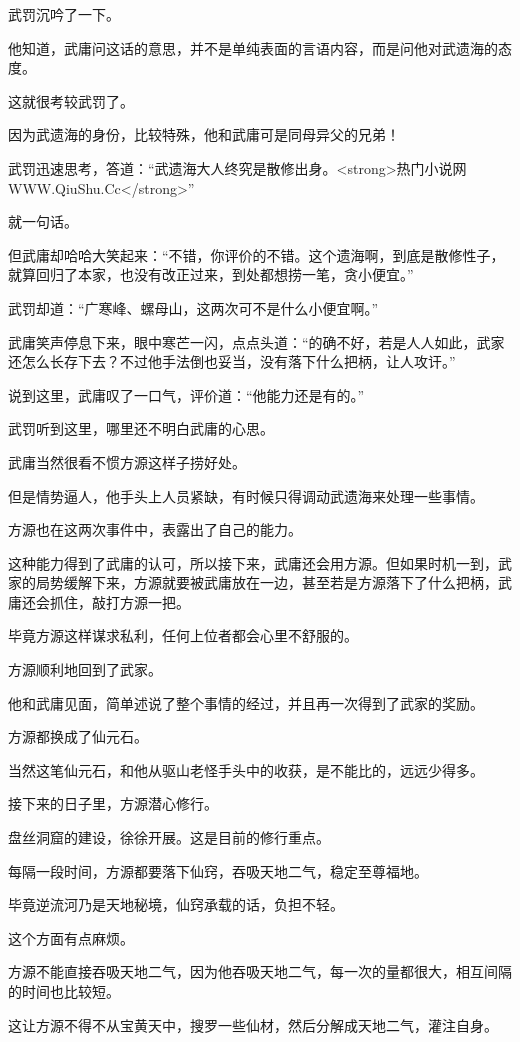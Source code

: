 \begin{this_body}
武罚沉吟了一下。

他知道，武庸问这话的意思，并不是单纯表面的言语内容，而是问他对武遗海的态度。

这就很考较武罚了。

因为武遗海的身份，比较特殊，他和武庸可是同母异父的兄弟！

武罚迅速思考，答道：“武遗海大人终究是散修出身。<strong>热门小说网WWW.QiuShu.Cc</strong>”

就一句话。

但武庸却哈哈大笑起来：“不错，你评价的不错。这个遗海啊，到底是散修性子，就算回归了本家，也没有改正过来，到处都想捞一笔，贪小便宜。”

武罚却道：“广寒峰、螺母山，这两次可不是什么小便宜啊。”

武庸笑声停息下来，眼中寒芒一闪，点点头道：“的确不好，若是人人如此，武家还怎么长存下去？不过他手法倒也妥当，没有落下什么把柄，让人攻讦。”

说到这里，武庸叹了一口气，评价道：“他能力还是有的。”

武罚听到这里，哪里还不明白武庸的心思。

武庸当然很看不惯方源这样子捞好处。

但是情势逼人，他手头上人员紧缺，有时候只得调动武遗海来处理一些事情。

方源也在这两次事件中，表露出了自己的能力。

这种能力得到了武庸的认可，所以接下来，武庸还会用方源。但如果时机一到，武家的局势缓解下来，方源就要被武庸放在一边，甚至若是方源落下了什么把柄，武庸还会抓住，敲打方源一把。

毕竟方源这样谋求私利，任何上位者都会心里不舒服的。

方源顺利地回到了武家。

他和武庸见面，简单述说了整个事情的经过，并且再一次得到了武家的奖励。

方源都换成了仙元石。

当然这笔仙元石，和他从驱山老怪手头中的收获，是不能比的，远远少得多。

接下来的日子里，方源潜心修行。

盘丝洞窟的建设，徐徐开展。这是目前的修行重点。

每隔一段时间，方源都要落下仙窍，吞吸天地二气，稳定至尊福地。

毕竟逆流河乃是天地秘境，仙窍承载的话，负担不轻。

这个方面有点麻烦。

方源不能直接吞吸天地二气，因为他吞吸天地二气，每一次的量都很大，相互间隔的时间也比较短。

这让方源不得不从宝黄天中，搜罗一些仙材，然后分解成天地二气，灌注自身。


\end{this_body}
